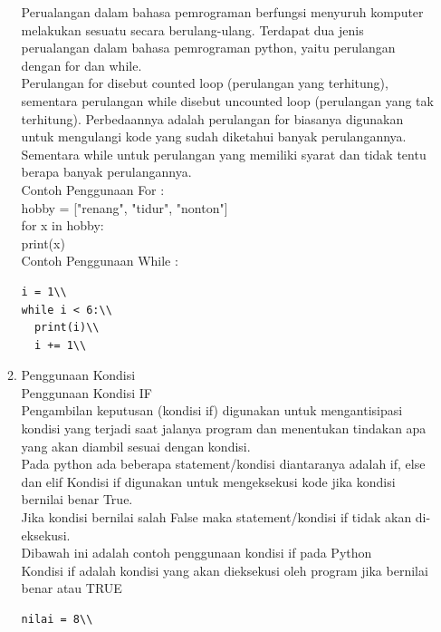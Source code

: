 \begin{enumerate}
\begin{enumerate}
Perualangan dalam bahasa pemrograman berfungsi menyuruh komputer melakukan sesuatu secara berulang-ulang. Terdapat dua jenis perualangan dalam bahasa pemrograman python, yaitu perulangan dengan for dan while.\\

Perulangan for disebut counted loop (perulangan yang terhitung), sementara perulangan while disebut uncounted loop (perulangan yang tak terhitung). Perbedaannya adalah perulangan for biasanya digunakan untuk mengulangi kode yang sudah diketahui banyak perulangannya. Sementara while untuk perulangan yang memiliki syarat dan tidak tentu berapa banyak perulangannya.\\

Contoh Penggunaan For :\\

hobby = ["renang", "tidur", "nonton"]\\
for x in hobby:\\
print(x)\\

Contoh Penggunaan While :\\
\begin{verbatim}
i = 1\\
while i < 6:\\
  print(i)\\
  i += 1\\
\end{verbatim}

\item Penggunaan Kondisi 
\\
Penggunaan Kondisi IF
\\
Pengambilan keputusan (kondisi if) digunakan untuk mengantisipasi kondisi yang terjadi saat jalanya program dan menentukan tindakan apa yang akan diambil sesuai dengan kondisi.
\\
Pada python ada beberapa statement/kondisi diantaranya adalah if, else dan elif Kondisi if digunakan untuk mengeksekusi kode jika kondisi bernilai benar True.
\\
Jika kondisi bernilai salah False maka statement/kondisi if tidak akan di-eksekusi.
\\
Dibawah ini adalah contoh penggunaan kondisi if pada Python
\\
Kondisi if adalah kondisi yang akan dieksekusi oleh program jika bernilai benar atau TRUE\\
\begin{verbatim}
nilai = 8\\


\end{verbatim}
\end{enumerate}
\end{enumerate}
